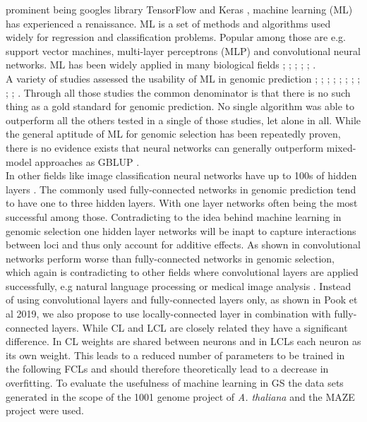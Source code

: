 prominent being googles library TensorFlow \cite{TF2016} and Keras \cite{keras2015},
machine learning (ML) has experienced a renaissance. ML is a set of methods and algorithms
used widely for regression and classification problems. Popular among those are
e.g. support vector machines, multi-layer perceptrons (MLP) and convolutional neural
networks. ML has been widely applied in many biological fields \cite{min2017deep};
\cite{lan2018survey}; \cite{mamoshina2016applications}; \cite{angermueller2016};
\cite{webb2018deep}; \cite{rampasek2016tensorflow}. \\
A variety of studies assessed the usability of ML in genomic prediction
\cite{gonzalez2018applications}; \cite{gonza2016}; \cite{ogutu2011comparison};
\cite{montesinos2019benchmarking}; \cite{grinberg2018evaluation}; \cite{cuevas2019deep};
\cite{montesinos2019new}; \cite{ma2017deepgs}; \cite{qiu2016application};
\cite{gonza2012}; \cite{li2018genomic}. Through all those studies the common denominator
is that there is no such thing as a gold standard for genomic prediction. No single
algorithm was able to outperform all the others tested in a single of those studies, let
alone in all. While the general aptitude of ML for genomic selection has been repeatedly
proven, there is no evidence exists that neural networks can generally outperform
mixed-model approaches as GBLUP \cite{hayes2001}. \\
In other fields like image classification neural networks have up to 100s of hidden layers
\cite{he2016deep}. The commonly used fully-connected networks in genomic prediction tend
to have one to three hidden layers. With one layer networks often being the most
successful among those. Contradicting to the idea behind machine learning in genomic
selection one hidden layer networks will be inapt to capture interactions between loci and
thus only account for additive effects. As shown in \cite{azodi2019} convolutional
networks perform worse than fully-connected networks in genomic selection, which again is
contradicting to other fields where convolutional layers are applied successfully, e.g
natural language processing \cite{dos2014deep} or medical image analysis
\cite{litjens2017survey}. Instead of using convolutional layers and fully-connected layers
only, as shown in Pook et al 2019, we also propose to use locally-connected layer in
combination with fully-connected layers. While CL and LCL are closely related they have a
significant difference. In CL weights are shared between neurons and in LCLs each neuron
as its own weight. This leads to a reduced number of parameters to be trained in the
following FCLs and should therefore theoretically lead to a decrease in overfitting. To
evaluate the usefulness of machine learning in GS the data sets generated in the scope of
the 1001 genome project of \textit{A. thaliana} \cite{1001genome} and the MAZE project
were used.

